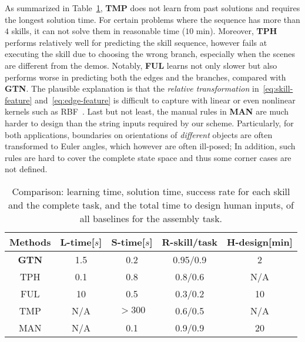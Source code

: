 As summarized in Table~\ref{table:compare}, 
\textbf{TMP} does not learn from past solutions and requires the longest solution time.
For certain problems where the sequence has more than $4$ skills, it can not solve them in reasonable time ($10$ min).
Moreover, \textbf{TPH} performs relatively well for predicting the skill sequence, however fails at executing the skill due to choosing the wrong branch, especially when the scenes are different from the demos.
Notably, \textbf{FUL} learns not only slower but also performs worse in predicting both the edges and the branches, compared with \textbf{GTN}.
The plausible explanation is that the \emph{relative transformation} in~\eqref{eq:skill-feature} and~\eqref{eq:edge-feature} is difficult to capture with linear or even nonlinear kernels such as RBF~\cite{bishop2006pattern}.
Last but not least, the manual rules in \textbf{MAN} are much harder to design than the string inputs required by our scheme. 
Particularly, for both applications, boundaries on orientations of \emph{different} objects are 
often transformed to Euler angles, which however are often ill-posed;
In addition, such rules are hard to cover the complete state space and thus some corner cases are not defined. 
\begin{table}[t]
\begin{center}
\begin{adjustbox}{height=0.15\linewidth}
\begin{tabular}{ccccc}
\toprule
Methods & L-time[$s$] & S-time[$s$] & R-skill/task & H-design[min]\\
\midrule
\textbf{GTN} & 1.5 & 0.2 & 0.95/0.9 & 2 \\
{TPH} & 0.1 & 0.8 & 0.8/0.6 & N/A \\
{FUL} & 10 & 0.5 & 0.3/0.2 & 10 \\
{TMP} & N/A & $>300$ & 0.6/0.5 & N/A \\
{MAN} & N/A & 0.1 & 0.9/0.9 & 20 \\
\bottomrule
\end{tabular}
\end{adjustbox}
\caption{Comparison: learning time, solution time, success rate for each skill and the complete task, and the total time to design human inputs, of all baselines for the assembly task.}
\label{table:compare}
\end{center}
\vspace{-0.35cm}
\end{table}
 
